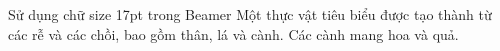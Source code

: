 \documentclass[17pt]{beamer}
\begin{document}
	\begin{frame}{Sử dụng chữ size 17pt trong Beamer}
		\justifying
		Một thực vật tiêu biểu được tạo thành từ các rễ và các chồi, bao gồm thân, lá và cành. Các cành mang hoa và quả.
	\end{frame}
\end{document}
